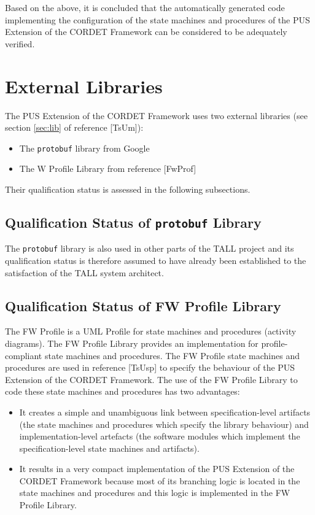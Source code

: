 \documentclass{pnp_article}
\begin{document}
Based on the above, it is concluded that the automatically generated code implementing the configuration of the state machines and procedures of the PUS Extension of the CORDET Framework can be considered to be adequately verified.



\section{External Libraries}\label{sec:svrExtLib}
The PUS Extension of the CORDET Framework uses two external libraries (see section \ref{sec:lib} of reference [TsUm]):

\begin{itemize}
\item The \texttt{protobuf} library from Google
\item The W Profile Library from reference [FwProf]
\end{itemize}

Their qualification status is assessed in the following subsections.

\subsection{Qualification Status of \texttt{protobuf} Library}
The \texttt{protobuf} library is also used in other parts of the TALL project and its qualification status is therefore assumed to have already been established to the satisfaction of the TALL system architect. 

\subsection{Qualification Status of FW Profile Library}
The FW Profile is a UML Profile for state machines and procedures (activity diagrams). The FW Profile Library provides an implementation for profile-compliant state machines and procedures. The FW Profile state machines and procedures are used in reference [TsUsp] to specify the behaviour of the PUS Extension of the CORDET Framework. The use of the FW Profile Library to code these state machines and procedures has two advantages:

\begin{itemize}
\item It creates a simple and unambiguous link between specification-level artifacts (the state machines and procedures which specify the library behaviour) and implementation-level artefacts (the software modules which implement the specification-level state machines and artifacts).
\item It results in a very compact implementation of the PUS Extension of the CORDET Framework because most of its branching logic is located in the state machines and procedures and this logic is implemented in the FW Profile Library. 
\end{itemize}
\end{document}
